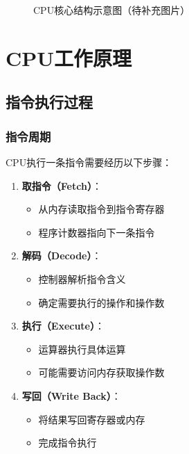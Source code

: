 \documentclass[12pt,UTF8]{ctexbook}
\begin{document}
\begin{figure}[htbp]
    \centering
    \caption{CPU核心结构示意图（待补充图片）}
    \label{fig:cpu_structure}
\end{figure}

\part{CPU工作原理}

\chapter{指令执行过程}

\section{指令周期}

CPU执行一条指令需要经历以下步骤：

\begin{enumerate}
    \item \textbf{取指令（Fetch）}：
    \begin{itemize}[leftmargin=2em]
        \item 从内存读取指令到指令寄存器
        \item 程序计数器指向下一条指令
    \end{itemize}
    
    \item \textbf{解码（Decode）}：
    \begin{itemize}[leftmargin=2em]
        \item 控制器解析指令含义
        \item 确定需要执行的操作和操作数
    \end{itemize}
    
    \item \textbf{执行（Execute）}：
    \begin{itemize}[leftmargin=2em]
        \item 运算器执行具体运算
        \item 可能需要访问内存获取操作数
    \end{itemize}
    
    \item \textbf{写回（Write Back）}：
    \begin{itemize}[leftmargin=2em]
        \item 将结果写回寄存器或内存
        \item 完成指令执行
    \end{itemize}
\end{enumerate}
\end{document}
